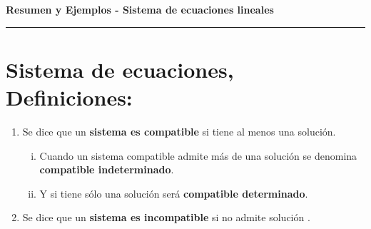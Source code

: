 \documentclass[11pt]{article}
\newcounter{teo}%
\begin{document}
\begin{center}
{\bf \Large{ Resumen y Ejemplos - Sistema de ecuaciones lineales }}
\end{center}

\hrule
\section{Sistema de ecuaciones, Definiciones:}

\begin{mdframed}[style= teoSty,frametitle={Definición: }]



\begin{enumerate}[1) ]
\item Se dice que un {\bf sistema es compatible} si tiene al menos una solución.
\begin{enumerate}[i) ]
\item Cuando un sistema compatible admite más de una solución se denomina {\bf compatible indeterminado}.
\item Y si tiene sólo una solución será {\bf compatible determinado}.
\end{enumerate}
\item Se dice que un {\bf sistema es incompatible} si no admite solución .
\end{enumerate}



\end{mdframed} 
\end{document}
